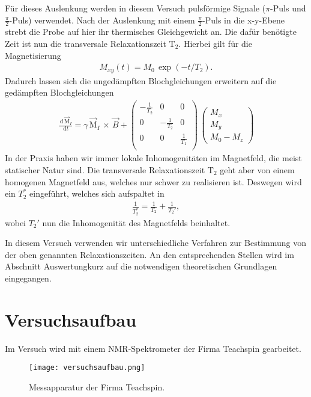 \documentclass[10pt,twoside]{article}
\renewcommand{\d}{~\text{d}}
\renewcommand{\1}{^{-1}}
\renewcommand{\2}{^{-2}}
\newcommand{\3}{^{-3}}
\newcommand{\4}{^{-4}}
\newcommand{\5}{^{-5}}
\newcommand{\6}{^{-6}}
\newcommand{\7}{^{-7}}
\newcommand{\8}{^{-8}}
\newcommand{\9}{^{-9}}
\begin{document}
Für dieses Auslenkung werden in diesem Versuch pulsförmige Signale ($\pi$-Puls und $\frac{\pi}{2}$-Puls) verwendet.
Nach der Auslenkung mit einem $\frac{\pi}{2}$-Puls in die x-y-Ebene strebt die Probe auf hier ihr thermisches Gleichgewicht an. 
Die dafür benötigte Zeit ist nun die transversale Relaxationszeit $\text{T}_2$. Hierbei gilt für die Magnetisierung
\begin{align*}
M_{xy}(t)=M_0\,\exp(-t/T_2){.}
\end{align*}
Dadurch lassen sich die ungedämpften Blochgleichungen erweitern auf die gedämpften Blochgleichungen
\begin{align*}
\frac{\d\,\vec{\text{M}}_I}{\d t} = \gamma\,\vec{\text{M}}_I\,\times\,\vec{B} 
+
\begin{pmatrix}
-\frac{1}{T_2} & 0 & 0\\
0 & -\frac{1}{T_2} & 0\\
0 & 0 & \frac{1}{T_1}\\
\end{pmatrix}\,
\begin{pmatrix}
M_x\\
M_y\\
M_0-M_z
\end{pmatrix}
\end{align*}
In der Praxis haben wir immer lokale Inhomogenitäten im Magnetfeld, die meist statischer Natur sind. 
Die transversale Relaxationszeit $\text{T}_2$ geht aber von einem homogenen Magnetfeld aus, welches nur schwer zu realisieren ist.
Deswegen wird ein $T_2^{\ast}$ eingeführt, welches sich aufspaltet in
\begin{align*}
\frac{1}{T_2^{\ast}} = \frac{1}{T_2} + \frac{1}{T_2'}{,}
\end{align*}
wobei $T_2'$ nun die Inhomogenität des Magnetfelds beinhaltet.
\newpage

In diesem Versuch verwenden wir unterschiedliche Verfahren zur Bestimmung von der oben genannten Relaxationszeiten. 
An den entsprechenden Stellen wird im Abschnitt \glqq Auswertung\grqq kurz auf die notwendigen theoretischen Grundlagen eingegangen. 


\section{Versuchsaufbau}

Im Versuch wird mit einem NMR-Spektrometer der Firma Teachspin gearbeitet.

\begin{figure}[H]
\centering
\texttt{[image: versuchsaufbau.png]} 
\caption{Messapparatur der Firma Teachspin.}
\label{fig:aufbau}
\end{figure}
\end{document}
